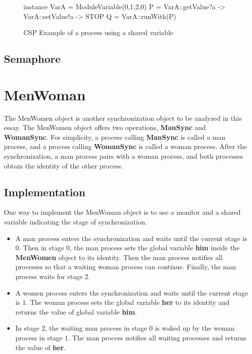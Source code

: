 \documentclass{article}
\begin{document}
\begin{figure}[hbtp]
\begin{cspm}
instance VarA = ModuleVariable({0,1,2},0)
P = VarA::getValue?a -> VarA::setValue!a -> STOP
Q = VarA::runWith(P)
\end{cspm}
\caption{CSP Example of a process using a shared variable}
\label{globalvar.csp.example}
\end{figure}


\subsection{Semaphore}


\section{MenWoman}
The MenWomen object is another synchronization object to be analyzed in this essay. The MenWomen object offers two operations, \textbf{ManSync} and \textbf{WomanSync}. For simplicity, a process calling \textbf{ManSync} is called a man process, and a process calling \textbf{WomanSync} is called a woman process. After the synchronization, a man process pairs with a woman process, and both processes obtain the identity of the other process. 

\subsection{Implementation}
One way to implement the MenWoman object is to use a monitor and a shared variable indicating the stage of synchronization. 
\begin{itemize}
  \item A man process enters the synchronization and waits until the current stage is $0$. Then in stage $0$, the man process sets the global variable \textbf{him} inside the \textbf{MenWomen} object to its identity. Then the man process notifies all processes so that a waiting woman process can continue. Finally, the man process waits for stage 2.
  \item A women process enters the synchronization and waits until the current stage is $1$. The woman process sets the global variable \textbf{her} to its identity and returns the value of global variable \textbf{him}.
  \item In stage $2$, the waiting man process in stage $0$ is waked up by the woman process in stage $1$. The man process notifies all waiting processes and returns the value of \textbf{her}.
\end{itemize}
\end{document}
